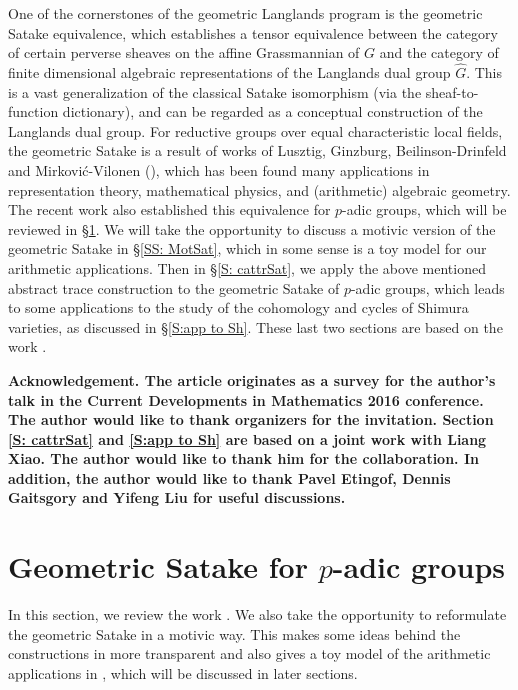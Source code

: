 \documentclass[11pt]{amsart}
\theoremstyle{definition}
\theoremstyle{definition}
\theoremstyle{definition}
\numberwithin{equation}{subsection}
\begin{document}
One of the cornerstones of the geometric Langlands program is the geometric Satake equivalence, which establishes a tensor equivalence between the category of certain perverse sheaves on the affine Grassmannian of $G$ and the category of finite dimensional algebraic representations of the Langlands dual group $\hat G$. This is a vast generalization of the classical Satake isomorphism (via the sheaf-to-function dictionary), and can be regarded as a conceptual construction of the Langlands dual group.
For reductive groups over equal characteristic local fields, the geometric Satake is a result of works of Lusztig, Ginzburg, Beilinson-Drinfeld and Mirkovi\'{c}-Vilonen (\cite{Lu,Gi1,BD,MV}), which has been found many applications in representation theory, mathematical physics, and (arithmetic) algebraic geometry. The recent work \cite{Zh1} also established this equivalence for $p$-adic groups,  which will be  reviewed in \S \ref{S: GSat}. We will take the opportunity to discuss a motivic version of the geometric Satake in \S \ref{SS: MotSat}, which in some sense is a toy model for our arithmetic applications. Then  in \S \ref{S: cattrSat}, we apply the above mentioned abstract trace construction to the geometric Satake of $p$-adic groups, which leads to some applications to the study of the cohomology and cycles of Shimura varieties, as discussed in \S \ref{S:app to Sh}. These last two sections are based on the work \cite{XZ}.

\medskip

\noindent\bf Acknowledgement. \rm The article originates as a survey for the author's talk in the Current Developments in Mathematics 2016 conference. The author would like to thank organizers for the invitation. Section \ref{S: cattrSat} and \ref{S:app to Sh} are based on a joint work with Liang Xiao. The author would like to thank him for the collaboration. In addition, the author would like to thank Pavel Etingof, Dennis Gaitsgory and Yifeng Liu for useful discussions.



\section{Geometric Satake for $p$-adic groups}
\label{S: GSat}
In this section, we review the work \cite{Zh1}. We also take the opportunity to reformulate the geometric Satake in a motivic way. This makes some ideas behind the constructions in \cite{Zh1} more transparent and also gives a toy model of the arithmetic applications in \cite{XZ}, which will be discussed in later sections.
\end{document}
